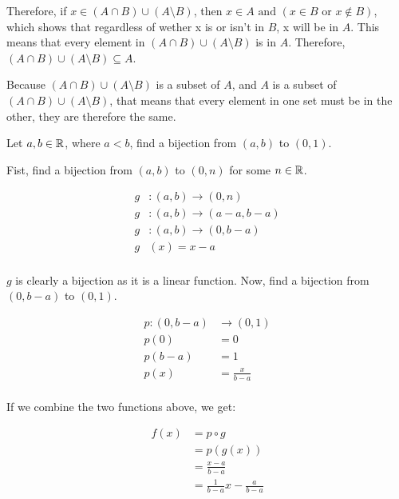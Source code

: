 \documentclass[12pt]{article} %
\begin{document}
\begin{homeworkProblem}
    Therefore, if $x \in (A \cap B)\cup (A \setminus B)$, then $x \in A \text{ and } (x \in B \text{ or } x \not \in B)$,
    which shows that regardless of wether x is or isn't in $B$, x will be in $A$. This means that every element in
    $(A \cap B)\cup (A \setminus B)$ is in $A$. Therefore, $(A \cap B)\cup (A \setminus B) \subseteq A$.

    Because $(A \cap B)\cup (A \setminus B)$ is a subset of $A$, and $A$ is a subset of $(A \cap B)\cup (A \setminus B)$, that means that
    every element in one set must be in the other, they are therefore the same.

\end{homeworkProblem}

\pagebreak

\begin{homeworkProblem}
    \begin{grayBoxed}
        Let $a, b \in \mathbb{R}$, where $a < b$, find a bijection from $(a, b)$ to $(0, 1)$.
    \end{grayBoxed}

    Fist, find a bijection from $(a, b)$ to $(0, n)$ for some $n \in \mathbb{R}$.

    \begin{align*}
        g & : (a, b) \rightarrow (0, n)         \\
        g & : (a, b) \rightarrow (a - a, b - a) \\
        g & : (a, b) \rightarrow (0, b - a)     \\
        g & (x)      = x - a                    \\
    \end{align*}

    $g$ is clearly a bijection as it is a linear function. Now, find a bijection from $(0, b - a)$ to $(0, 1)$.

    \begin{align*}
        p: (0, b - a) & \rightarrow (0, 1) \\
        p (0)         & = 0                \\
        p (b - a)     & = 1                \\
        p (x)         & = \frac{x}{b - a}  \\
    \end{align*}

    If we combine the two functions above, we get:

    \begin{align*}
        f(x) & = p \circ g                           \\
             & = p(g(x))                             \\
             & = \frac{x - a}{b - a}                 \\
             & = \frac{1}{b - a} x - \frac{a}{b - a} \\
    \end{align*}


\end{homeworkProblem}
\end{document}
